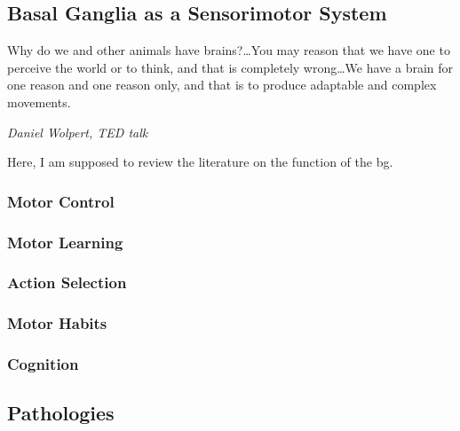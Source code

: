 \subsection{Basal Ganglia as a Sensorimotor System}
\label{intro:BGMotor}
\epigraph{Why do we and other animals have brains?\ldots You may reason that we have one to perceive the world or to think, and that is completely wrong\ldots We have a brain for one reason and one reason only, and that is to produce adaptable and complex movements.}
{\textit{Daniel Wolpert, TED talk}}
\noindent

Here, I am supposed to review the literature on the function of the \gls{bg}.

\subsubsection{Motor Control} \label{intro:motorControl}
\subsubsection{Motor Learning} \label{intro:motorLearning}
\subsubsection{Action Selection} \label{intro:actionSelection}
\subsubsection{Motor Habits} \label{intro:motorHabits}
\subsubsection{Cognition} \label{intro:bgCognition}

\subsection{Pathologies}
\label{intro:Motor:pathologies}
